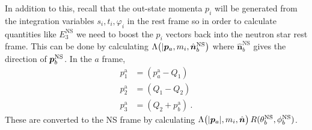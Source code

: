 In addition to this, recall that the out-state momenta $p_i$ will be generated from the integration variables $s_i, t_i, \varphi_i$ in the rest frame so in order to calculate quantities like $E_3^{\mathrm{NS}}$ we need to boost the $p_i$ vectors back into the neutron star rest frame.
This can be done by calculating $\Lambda \big ( |\pvec[a], m_i, \hat{\bm{n}}_b^{\mathrm{NS}} \big)$ where $\hat{\bm{n}}_b^{\mathrm{NS}}$ gives the direction of $\pvec[b]^{\mathrm{NS}}$. 
In the $a$ frame,
\begin{align}
    p_1^{\mathrm{a}} &= (p_a^\mathrm{a} - Q_1) \\
    p_2^{\mathrm{a}} &= (Q_1 - Q_2) \\
    p_3^{\mathrm{a}} &= (Q_2 + p_b^\mathrm{a}) \ .
\end{align}
These are converted to the NS frame by calculating $\Lambda \big (|\pvec[a]|, m_i, \hat{\bm{n}}\big) \, R(\theta_b^{\mathrm{NS}}, \phi_b^{\mathrm{NS}})$.